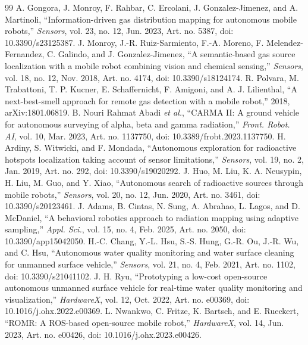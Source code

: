 \begin{thebibliography}{99}
A. Gongora, J. Monroy, F. Rahbar, C. Ercolani, J. Gonzalez-Jimenez, and A. Martinoli, ``Information-driven gas distribution mapping for autonomous mobile robots,'' \textit{Sensors}, vol. 23, no. 12, Jun. 2023, Art. no. 5387, doi: 10.3390/s23125387.
J. Monroy, J.-R. Ruiz-Sarmiento, F.-A. Moreno, F. Melendez-Fernandez, C. Galindo, and J. Gonzalez-Jimenez, ``A semantic-based gas source localization with a mobile robot combining vision and chemical sensing,'' \textit{Sensors}, vol. 18, no. 12, Nov. 2018, Art. no. 4174, doi: 10.3390/s18124174.
R. Polvara, M. Trabattoni, T. P. Kucner, E. Schaffernicht, F. Amigoni, and A. J. Lilienthal, ``A next-best-smell approach for remote gas detection with a mobile robot,'' 2018, arXiv:1801.06819.
B. Nouri Rahmat Abadi \textit{et al.}, ``CARMA II: A ground vehicle for autonomous surveying of alpha, beta and gamma radiation,'' \textit{Front. Robot. AI}, vol. 10, Mar. 2023, Art. no. 1137750, doi: 10.3389/frobt.2023.1137750.
H. Ardiny, S. Witwicki, and F. Mondada, ``Autonomous exploration for radioactive hotspots localization taking account of sensor limitations,'' \textit{Sensors}, vol. 19, no. 2, Jan. 2019, Art. no. 292, doi: 10.3390/s19020292.
J. Huo, M. Liu, K. A. Neusypin, H. Liu, M. Guo, and Y. Xiao, ``Autonomous search of radioactive sources through mobile robots,'' \textit{Sensors}, vol. 20, no. 12, Jun. 2020, Art. no. 3461, doi: 10.3390/s20123461.
J. Adams, B. Cintas, N. Sung, A. Abrahao, L. Lagos, and D. McDaniel, ``A behavioral robotics approach to radiation mapping using adaptive sampling,'' \textit{Appl. Sci.}, vol. 15, no. 4, Feb. 2025, Art. no. 2050, doi: 10.3390/app15042050.
H.-C. Chang, Y.-L. Hsu, S.-S. Hung, G.-R. Ou, J.-R. Wu, and C. Hsu, ``Autonomous water quality monitoring and water surface cleaning for unmanned surface vehicle,'' \textit{Sensors}, vol. 21, no. 4, Feb. 2021, Art. no. 1102, doi: 10.3390/s21041102.
J. H. Ryu, ``Prototyping a low-cost open-source autonomous unmanned surface vehicle for real-time water quality monitoring and visualization,'' \textit{HardwareX}, vol. 12, Oct. 2022, Art. no. e00369, doi: 10.1016/j.ohx.2022.e00369.
L. Nwankwo, C. Fritze, K. Bartsch, and E. Rueckert, ``ROMR: A ROS-based open-source mobile robot,'' \textit{HardwareX}, vol. 14, Jun. 2023, Art. no. e00426, doi: 10.1016/j.ohx.2023.e00426.

\end{thebibliography}

